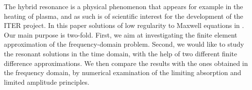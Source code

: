 The hybrid resonance is a physical phenomenon
that appears for example in the heating of plasma,
and as such is of scientific interest for the development  of  the ITER project.
In this paper  solutions of low regularity to Maxwell equations in
. 
Our main purpose is two-fold. First, we aim at investigating the finite element approximation 
of the frequency-domain problem. Second, we would like to study the resonant solutions 
in the time domain, with the help of two different finite difference approximations. 
We then compare the results with the ones obtained in the frequency domain, by  
numerical examination of the limiting absorption and limited amplitude principles. 